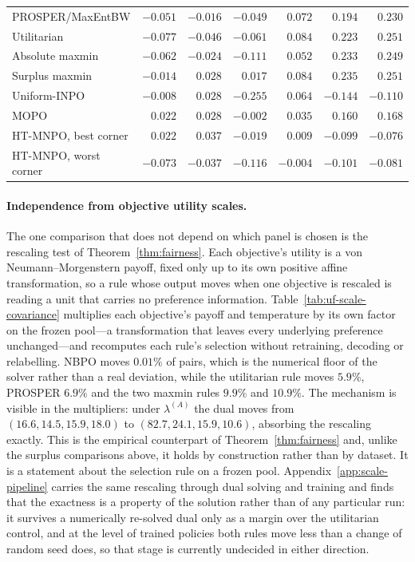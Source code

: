 \documentclass{article}
\theoremstyle{remark}
\theoremstyle{plain}
\newcommand{\NBPO}{\textsc{NBPO}}
\begin{document}
\begin{table}[t]
\begin{tabular}{lrrrrrr}
PROSPER/MaxEntBW & $-0.051$ & $-0.016$ & $-0.049$ & $0.072$ & $0.194$ & $0.230$\\
Utilitarian & $-0.077$ & $-0.046$ & $-0.061$ & $0.084$ & $0.223$ & $0.251$\\
Absolute maxmin & $-0.062$ & $-0.024$ & $-0.111$ & $0.052$ & $0.233$ & $0.249$\\
Surplus maxmin & $-0.014$ & $0.028$ & $\mathbf{0.017}$ & $0.084$ & $\mathbf{0.235}$ & $\mathbf{0.251}$\\
Uniform-INPO & $-0.008$ & $0.028$ & $-0.255$ & $0.064$ & $-0.144$ & $-0.110$\\
MOPO & $0.022$ & $0.028$ & $-0.002$ & $0.035$ & $0.160$ & $0.168$\\
HT-MNPO, best corner & $0.022$ & $0.037$ & $-0.019$ & $0.009$ & $-0.099$ & $-0.076$\\
HT-MNPO, worst corner & $-0.073$ & $-0.037$ & $-0.116$ & $-0.004$ & $-0.101$ & $-0.081$\\
\bottomrule
\end{tabular}
\end{table}

\paragraph{Independence from objective utility scales.}
The one comparison that does not depend on which panel is chosen is the rescaling test of
Theorem~\ref{thm:fairness}. Each objective's utility is a von Neumann--Morgenstern payoff, fixed only up to
its own positive affine transformation, so a rule whose output moves when one objective is rescaled is
reading a unit that carries no preference information. Table~\ref{tab:uf-scale-covariance} multiplies each
objective's payoff and temperature by its own factor on the frozen pool---a transformation that leaves every
underlying preference unchanged---and recomputes each rule's selection without retraining, decoding or
relabelling. \NBPO{} moves $0.01\%$ of pairs, which is the numerical floor of the solver rather than a real
deviation, while the utilitarian rule moves $5.9\%$, PROSPER $6.9\%$ and the two maxmin rules $9.9\%$ and
$10.9\%$. The mechanism is visible in the multipliers: under $\lambda^{(A)}$ the dual moves from
$(16.6,14.5,15.9,18.0)$ to $(82.7,24.1,15.9,10.6)$, absorbing the rescaling exactly. This is the empirical
counterpart of Theorem~\ref{thm:fairness} and, unlike the surplus comparisons above, it holds by
construction rather than by dataset. It is a statement about the selection rule on a frozen pool.
Appendix~\ref{app:scale-pipeline} carries the same rescaling through dual solving and training and
finds that the exactness is a property of the solution rather than of any particular run: it survives
a numerically re-solved dual only as a margin over the utilitarian control, and at the level of trained
policies both rules move less than a change of random seed does, so that stage is currently
undecided in either direction.
\end{document}

